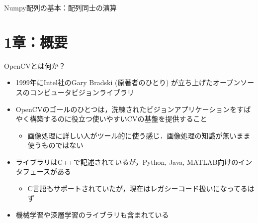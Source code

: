 \documentclass[10pt]{beamer}
\begin{document}
\begin{frame}[fragile]{Numpy配列の基本：配列同士の演算}
\begin{center}
        \end{center}
	\end{frame}
	
	\section{1章：概要}

	\begin{frame}{OpenCVとは何か？}
		\begin{itemize}
    	    \item 1999年にIntel社のGary Bradski (原著者のひとり) が立ち上げたオープンソースのコンピュータビジョンライブラリ
            \item OpenCVのゴールのひとつは，洗練されたビジョンアプリケーションをすばやく構築するのに役立つ使いやすいCVの基盤を提供すること
                \begin{itemize}
                    \item 画像処理に詳しい人がツール的に使う感じ．画像処理の知識が無いまま使うものではない
                \end{itemize}
		    \item ライブラリはC++で記述されているが，Python, Java, MATLAB向けのインタフェースがある
		        \begin{itemize}
		            \item C言語もサポートされていたが，現在はレガシーコード扱いになってるはず
		        \end{itemize}
            \item 機械学習や深層学習のライブラリも含まれている
		\end{itemize}
	\end{frame}
	
\end{document}
